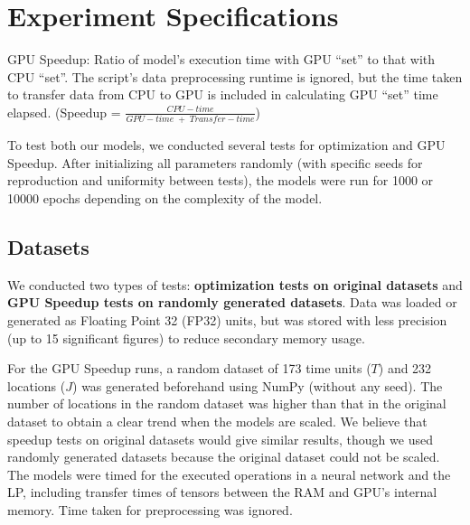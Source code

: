 \chapter{Experiment Specifications} \label{sec:Experiment Specifications}
\begin{mydef} \label{def:GPU Speedup}
    GPU Speedup: Ratio of model's execution time with GPU ``set'' to that with CPU ``set''. The script's data preprocessing runtime is ignored, but the time taken to transfer data from CPU to GPU is included in calculating GPU ``set'' time elapsed. (Speedup = $\frac{CPU-time}{GPU-time\; +\; Transfer-time}$)
\end{mydef}

To test both our models, we conducted several tests for optimization and GPU Speedup. After initializing all parameters randomly (with specific seeds for reproduction and uniformity between tests), the models were run for 1000 or 10000 epochs depending on the complexity of the model.

\section{Datasets} \label{sec:Datasets}
We conducted two types of tests: \textbf{optimization tests on original datasets} and \textbf{GPU Speedup tests on randomly generated datasets}. Data was loaded or generated as Floating Point 32 (FP32) units, but was stored with less precision (up to 15 significant figures) to reduce secondary memory usage.

For the GPU Speedup runs, a random dataset of 173 time units ($T$) and 232 locations ($J$) was generated beforehand using NumPy (without any seed). The number of locations in the random dataset was higher than that in the original dataset to obtain a clear trend when the models are scaled. We believe that speedup tests on original datasets would give similar results, though we used randomly generated datasets because the original dataset could not be scaled. The models were timed for the executed operations in a neural network and the LP, including transfer times of tensors between the RAM and GPU's internal memory. Time taken for preprocessing was ignored. 

